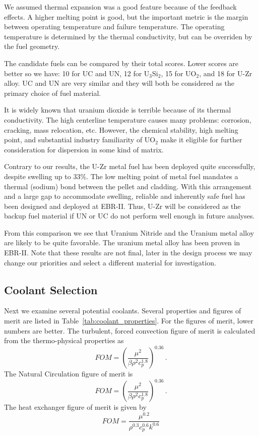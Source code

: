\documentclass[]{report}
\begin{document}
We assumed thermal expansion was a good feature because of the feedback effects. A higher melting point is good, but the important metric is the margin between operating temperature and failure temperature. The operating temperature is determined by the thermal conductivity, but can be overriden by the fuel geometry. 

The candidate fuels can be compared by their total scores. Lower scores are better so we have: 10 for UC and UN, 12 for U$_3$Si$_2$, 15 for UO$_2$, and 18 for U-Zr alloy. UC and UN are very similar and they will both be considered as the primary choice of fuel material. 

It is widely known that uranium dioxide is terrible because of its thermal conductivity. The high centerline temperature causes many problems: corrosion, cracking, mass relocation, etc. 
However, the chemical stability, high melting point, and substantial industry familiarity of UO$_2$ make it eligible for further consideration for dispersion in some kind of matrix.

Contrary to our results, the U-Zr metal fuel has been deployed quite successfully, despite swelling up to 33\%. The low melting point of metal fuel mandates a thermal (sodium) bond between the pellet and cladding. 
With this arrangement and a large gap to accommodate swelling, reliable and inherently safe fuel has been designed and deployed at EBR-II.
Thus, U-Zr will be considered as the backup fuel material if UN or UC do not perform well enough in future analyses.

From this comparison we see that Uranium Nitride and the Uranium metal alloy are likely to be quite favorable. The uranium metal alloy has been proven in EBR-II. Note that these results are not final, later in the design process we may change our priorities and select a different material for investigation.

\subsection{Coolant Selection}
Next we examine several potential coolants. Several properties and figures of merit are listed in Table~\ref{tab:coolant_properties}. For the figures of merit, lower numbers are better. The turbulent, forced convection figure of merit is calculated from the thermo-physical properties as 
\begin{equation}
FOM=\left(\frac{\mu^2}{\beta\rho^2c_p^{1.8} } \right)^{0.36}\,.
\end{equation}
The Natural Circulation figure of merit is
\begin{equation}
FOM= \left( \frac{\mu^2}{\beta\rho^2c_p^{1.8}}  \right)^{0.36} \,.
\end{equation}
 The heat exchanger figure of merit is given by 
\begin{equation}
FOM= \frac{\mu^{0.2}}{\rho^{0.3}c_p^{0.6}k^{0.6}}
\end{equation} 
 
\end{document}
